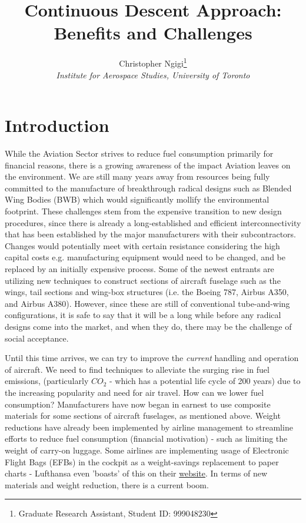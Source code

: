 \documentclass{aer1315-pretty}
\author[]{ %
Christopher Ngigi\thanks{Graduate Research Assistant, Student ID: 999048230}\\
\textit{Institute for Aerospace Studies, University of Toronto}}
\title{Continuous Descent Approach: Benefits and Challenges}
\begin{document}
\maketitle

\section{Introduction}
While the Aviation Sector strives to reduce fuel consumption primarily for financial reasons, there is a growing awareness of the impact Aviation leaves on the environment. We are still many years away from  resources being fully committed to the manufacture of breakthrough radical designs such as Blended Wing Bodies (BWB) which would significantly mollify the environmental footprint. These challenges stem from the expensive transition to new design procedures, since there is already a long-established and efficient interconnectivity that has been established by the major manufacturers with their subcontractors. Changes would potentially meet with certain resistance considering the high capital costs e.g. manufacturing equipment would need to be changed, and be replaced by an initially expensive process. Some of the newest entrants are utilizing new techniques to construct sections of aircraft fuselage such as the wings, tail sections and wing-box structures (i.e. the Boeing 787, Airbus A350, and Airbus A380). However, since these are still of conventional tube-and-wing configurations,  it is safe to say that it will be a long while  before any radical designs come into the market, and when they do, there may be the challenge of social acceptance.\par

Until this time arrives, we can try to improve the \textit{current} handling and operation of aircraft. We need to find techniques to alleviate the surging rise in fuel emissions, (particularly $CO_2$ - which has a potential life cycle of 200 years) due to the increasing popularity and need for air travel. How can we lower fuel consumption? Manufacturers have now began in earnest to use composite materials for some sections of aircraft fuselages, as mentioned above. Weight reductions have already been implemented by airline management to streamline efforts to reduce fuel consumption (financial motivation) - such as limiting the weight of carry-on luggage. Some airlines are implementing usage of Electronic Flight Bags (EFBs) in the cockpit as a weight-savings replacement to paper charts - Lufthansa even 'boasts' of this on their \href{http://www.lufthansagroup.com/en/press/news-releases/singleview/archive/2013/september/25/article/2615.html}{website}. In terms of new materials and weight reduction, there is a current boom.\par
\end{document}
